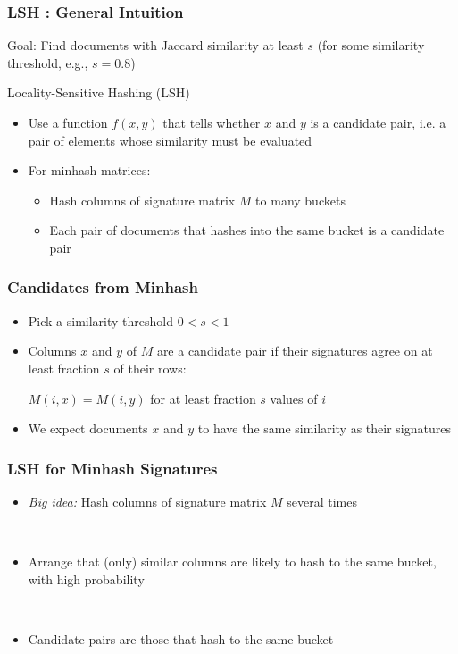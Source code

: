 \documentclass[svgnames]{beamer}
\begin{document}
  
\begin{frame} \frametitle{LSH : General Intuition}

\begin{block}{Goal:}
Find documents with Jaccard similarity at least $s$ (for some similarity threshold, e.g., $s=0.8$)
\end{block}
\begin{block}{Locality-Sensitive Hashing (LSH)}
\begin{itemize}
\item Use a function $f(x,y)$ that tells whether $x$ and $y$ is a candidate pair, i.e. a pair of elements whose similarity must be evaluated
\item For minhash matrices:
  \begin{itemize}
  \item Hash columns of signature matrix $M$ to many buckets
  \item Each pair of documents that hashes into the same bucket is a candidate pair
\end{itemize}
\end{itemize}
\end{block}
\end{frame}

  
\begin{frame} \frametitle{Candidates from Minhash}

\begin{itemize}
\item Pick a similarity threshold $0 < s < 1$
\item Columns $x$ and $y$ of $M$ are a candidate pair if their signatures agree on at least fraction $s$ of their rows: 

\begin{center}
$M(i, x) = M(i, y)$ for at least fraction $s$ values of $i$
\end{center}

\item We expect documents $x$ and $y$ to have the same similarity as their signatures
\end{itemize}
\end{frame}

  
\begin{frame} \frametitle{LSH for Minhash Signatures}

\begin{itemize}
\item \emph{Big idea:} Hash columns of signature matrix $M$ several times

~\\

\item Arrange that (only) similar columns are likely to hash to the same bucket, with high probability

~\\

\item Candidate pairs are those that hash to the same bucket
\end{itemize}
\end{frame}
\end{document}
